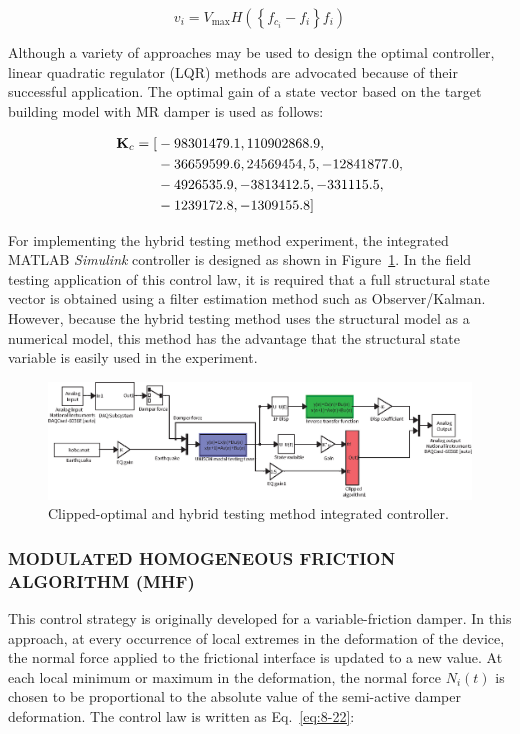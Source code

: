 \begin{equation}\label{eq:8-21}
v_{i} = V_{\text{max}}H\left(\left\{f_{c_{i}}-f_{i}\right\}f_{i}\right)
\end{equation}

Although a variety of approaches may be used to design the optimal controller, linear quadratic regulator (LQR) methods are advocated because of their successful application. The optimal gain of a state vector based on the target building model with MR damper is used as follows:

\begin{align*}
\mathbf{K}_{c} = [&-98301479.1,110902868.9,\\
&-36659599.6,24569454,5, -12841877.0,\\
&-4926535.9, -3813412.5, -331115.5,\\
&-1239172.8, -1309155.8]
\end{align*}

For implementing the hybrid testing method experiment, the integrated MATLAB \textit{Simulink} controller is designed as shown in Figure~\ref{fig:8-14}. In the field testing application of this control law, it is required that a full structural state vector is obtained using a filter estimation method such as Observer/Kalman. However, because the hybrid testing method uses the structural model as a numerical model, this method has the advantage that the structural state variable is easily used in the experiment.

\begin{figure}[H]
\centering
\includegraphics[width=1\textwidth] {figure/8-14.eps}
\caption{Clipped-optimal and hybrid testing method integrated controller.}
\label{fig:8-14}
\end{figure}

\subsubsection{MODULATED HOMOGENEOUS FRICTION ALGORITHM (MHF)}

This control strategy is originally developed for a variable-friction damper. In this approach, at every occurrence of local extremes in the deformation of the device, the normal force applied to the frictional interface is updated to a new value. At each local minimum or maximum in the deformation, the normal force $N_{i}(t)$ is chosen to be proportional to the absolute value of the semi-active damper deformation. The control law is written as Eq.~\eqref{eq:8-22}\citep{inaudi1997modulated}:

